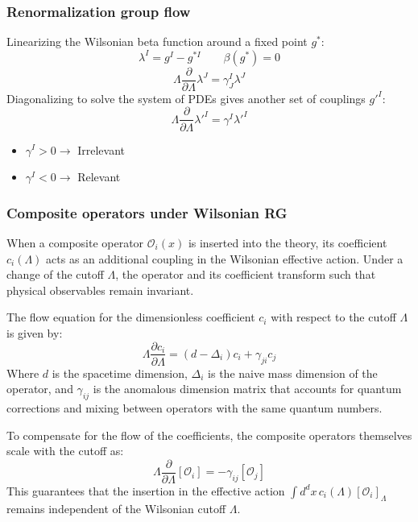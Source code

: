 \documentclass{article}
\begin{document}
\subsubsection*{Renormalization group flow}
Linearizing the Wilsonian beta function around a fixed point $g^*$:
\begin{equation}
    \lambda^I = g^I - g^{*I} \qquad \beta(g^*) = 0
\end{equation}
\begin{equation}
    \Lambda \frac{\partial}{\partial \Lambda}\lambda^J = \gamma^I_J\lambda^J
\end{equation}
Diagonalizing to solve the system of PDEs gives another set of couplings $g'^I$:
\begin{equation}
    \Lambda \frac{\partial}{\partial \Lambda}\lambda'^I = \gamma^I\lambda'^I
\end{equation}
\begin{itemize}
    \item $\gamma^I > 0 \rightarrow$ Irrelevant
    \item $\gamma^I < 0 \rightarrow$ Relevant
\end{itemize}
\subsubsection*{Composite operators under Wilsonian RG}
When a composite operator $\mathcal{O}_i(x)$ is inserted into the theory, its coefficient $c_i(\Lambda)$ acts as an additional coupling in the Wilsonian effective action. Under a change of the cutoff $\Lambda$, the operator and its coefficient transform such that physical observables remain invariant.

The flow equation for the dimensionless coefficient $c_i$ with respect to the cutoff $\Lambda$ is given by:
\begin{equation}
    \Lambda \frac{\partial c_i}{\partial \Lambda} = (d - \Delta_i)c_i + \gamma_{ji} c_j
\end{equation}
Where $d$ is the spacetime dimension, $\Delta_i$ is the naive mass dimension of the operator, and $\gamma_{ij}$ is the anomalous dimension matrix that accounts for quantum corrections and mixing between operators with the same quantum numbers.

To compensate for the flow of the coefficients, the composite operators themselves scale with the cutoff as:
\begin{equation}
    \Lambda \frac{\partial}{\partial \Lambda} [\mathcal{O}_i] = - \gamma_{ij} [\mathcal{O}_j]
\end{equation}
This guarantees that the insertion in the effective action $\int d^d x \, c_i(\Lambda) [\mathcal{O}_i]_\Lambda$ remains independent of the Wilsonian cutoff $\Lambda$.
\end{document}
